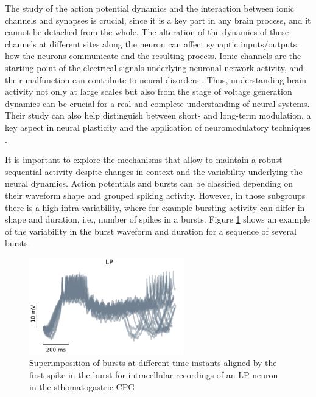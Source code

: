 The study of the action potential dynamics and the interaction between ionic channels and synapses is crucial, since it is a key part in any brain process, and it cannot be detached from the whole. The alteration of the dynamics of these channels at different sites along the neuron can affect synaptic inputs/outputs, how the neurons communicate and the resulting process. Ionic channels are the starting point of the electrical signals underlying neuronal network activity, and their malfunction can contribute to neural disorders \parencite{kecskes_editorial_2023}. Thus, understanding brain activity not only at large scales but also from the stage of voltage generation dynamics can be crucial for a real and complete understanding of neural systems. Their study can also help distinguish between short- and long-term modulation, a key aspect in neural plasticity and the application of neuromodulatory techniques \parencite{chambers_light-activated_2008,burke_modulation_2019}.

 
It is important to explore the mechanisms that allow to maintain a robust sequential activity despite changes in context and the variability underlying the neural dynamics. Action potentials and bursts can be classified depending on their waveform shape and grouped spiking activity. However, in those subgroups there is a high intra-variability, where for example bursting activity can differ in shape and duration, i.e., number of spikes in a bursts. Figure \ref{fig:burst variability} shows an example of the variability in the burst waveform and duration for a sequence of several bursts. 


\begin{figure}[htb!]
	\centering
	\includegraphics[width=0.6\textwidth]{img/intro/burst_variability.pdf}
	\caption{Superimposition of bursts at different time instants aligned by the first spike in the burst for intracellular recordings of an LP neuron in the sthomatogastric CPG.}
	\label{fig:burst variability}
\end{figure}

